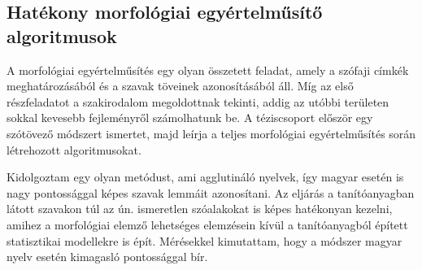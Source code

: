 \let\oldthesubsection=\thesubsection
\renewcommand{\thesubsection}{\Roman{subsection}}



\subsection{Hatékony morfológiai egyértelműsítő algoritmusok}
\label{thes:morf}

A morfológiai egyértelműsítés egy olyan összetett feladat, amely a szófaji címkék meghatározásából és a szavak töveinek azonosításából áll. 
Míg az első részfeladatot a szakirodalom megoldottnak tekinti, addig az utóbbi területen sokkal kevesebb fejleményről számolhatunk be. 
A téziscsoport először egy szótövező módszert ismertet, majd leírja a teljes morfológiai egyértelműsítés során létrehozott algoritmusokat.

\begin{core}
\begin{thesis}\label{thes:morf-lemma}
Kidolgoztam egy olyan metódust, ami agglutináló nyelvek, így magyar esetén is nagy pontossággal képes szavak lemmáit azonosítani. 
Az eljárás a tanítóanyagban látott szavakon túl az ún. ismeretlen szóalakokat is képes hatékonyan kezelni, amihez a morfológiai elemző lehetséges elemzésein kívül a tanítóanyagból épített statisztikai modellekre is épít. 
Mérésekkel kimutattam, hogy a módszer magyar nyelv esetén kimagasló pontossággal bír. 
\end{thesis} 

\begin{pub}
\cite{Orosz2011,Orosz2012,Orosz2012a,Orosz2013a}
\end{pub}
\end{core}

